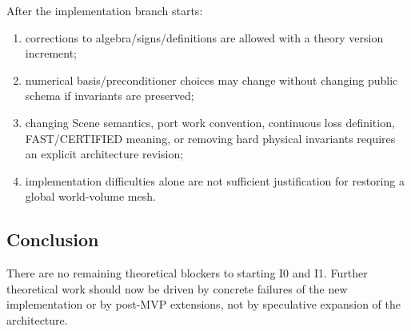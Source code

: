 After the implementation branch starts:
\begin{enumerate}
\item corrections to algebra/signs/definitions are allowed with a theory
      version increment;
\item numerical basis/preconditioner choices may change without changing public
      schema if invariants are preserved;
\item changing Scene semantics, port work convention, continuous loss
      definition, FAST/CERTIFIED meaning, or removing hard physical invariants
      requires an explicit architecture revision;
\item implementation difficulties alone are not sufficient justification for
      restoring a global world-volume mesh.
\end{enumerate}

\subsection{Conclusion}

There are no remaining theoretical blockers to starting I0 and I1. Further
theoretical work should now be driven by concrete failures of the new
implementation or by post-MVP extensions, not by speculative expansion of the
architecture.
